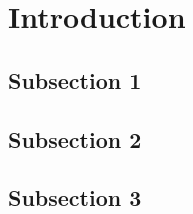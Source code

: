\section{Introduction}

\subsection{Subsection 1}

\subsection{Subsection 2}

\subsection{Subsection 3}
